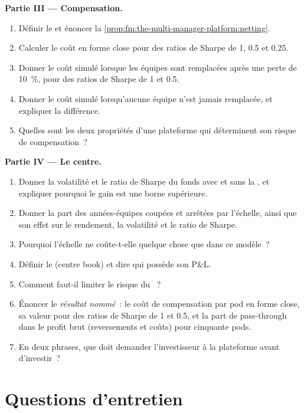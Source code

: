 \begin{problem}
\medskip\noindent\textbf{Partie III --- Compensation.}
\begin{enumerate}[resume]
\item Définir le  et énoncer la \cref{prop:fm:the-multi-manager-platform:netting}.
\item Calculer le coût en forme close pour des ratios de Sharpe de 1, 0.5 et 0.25.
\item Donner le coût simulé lorsque les équipes sont remplacées après une perte de 10~\%, pour des ratios de Sharpe de 1 et 0.5.
\item Donner le coût simulé lorsqu'aucune équipe n'est jamais remplacée, et expliquer la différence.
\item Quelles sont les deux propriétés d'une plateforme qui déterminent son risque de compensation~?
\end{enumerate}

\medskip\noindent\textbf{Partie IV --- Le centre.}
\begin{enumerate}[resume]
\item Donner la volatilité et le ratio de Sharpe du fonds avec et sans la , et expliquer pourquoi le gain est une borne supérieure.
\item Donner la part des années-équipes coupées et arrêtées par l'échelle, ainsi que son effet sur le rendement, la volatilité et le ratio de Sharpe.
\item Pourquoi l'échelle ne coûte-t-elle quelque chose que dans ce modèle~?
\item Définir le  (centre book) et dire qui possède son P\&L.
\item Comment faut-il limiter le risque du ~?
\item Énoncer le \emph{résultat nommé}~: le coût de compensation par pod en forme close, sa valeur pour des ratios de Sharpe de 1 et 0.5, et la part de
pass-through dans le profit brut (reversements et coûts) pour cinquante pods.
\item En deux phrases, que doit demander l'investisseur à la plateforme avant d'investir~?
\end{enumerate}
\end{problem}

\section{Questions d'entretien}

